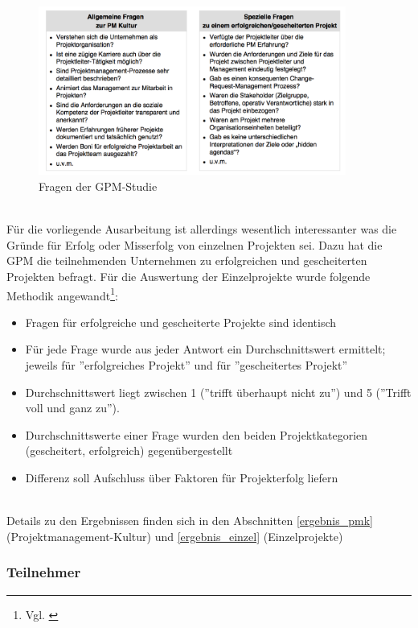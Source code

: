 \documentclass[12pt]{scrartcl}
\begin{document}
\begin{figure}[H]
	\begin{center}
		\includegraphics[width=0.9\textwidth]{img/fragen_gpm_studie}
		\caption{Fragen der GPM-Studie}
		\label{fragen_gpm_studie}	
	\end{center}
\end{figure}
\ 
\\
Für die vorliegende Ausarbeitung ist allerdings wesentlich interessanter was die Gründe für Erfolg oder Misserfolg von einzelnen Projekten sei. Dazu hat die GPM die teilnehmenden Unternehmen zu erfolgreichen und gescheiterten Projekten befragt. Für die Auswertung der Einzelprojekte wurde folgende Methodik angewandt\footnote{Vgl. \cite{GPM_Studie_2008, Seite 9}}:
\begin{itemize}
    \item{Fragen für erfolgreiche und gescheiterte Projekte sind identisch}
    \item{Für jede Frage wurde aus jeder Antwort ein Durchschnittswert ermittelt; jeweils für ''erfolgreiches Projekt'' und für ''gescheitertes Projekt''}
    \item{Durchschnittswert liegt zwischen 1 (''trifft überhaupt nicht zu'') und 5 (''Trifft voll und ganz zu'').}
    \item{Durchschnittswerte einer Frage wurden den beiden Projektkategorien (gescheitert, erfolgreich) gegenübergestellt}
    \item{Differenz soll Aufschluss über Faktoren für Projekterfolg liefern}
\end{itemize}
\
\\
Details zu den Ergebnissen finden sich in den Abschnitten \ref{ergebnis_pmk} (Projektmanagement-Kultur) und \ref{ergebnis_einzel} (Einzelprojekte)

\subsubsection{Teilnehmer}
\end{document}
